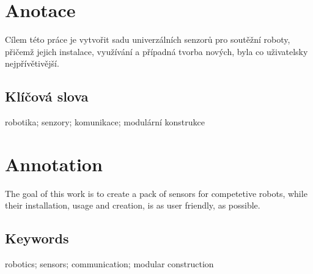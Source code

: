 \documentclass{template/socthesis}
\author{Tomáš Rohlínek}
\begin{document}
	\maketitle
	
	
	
	\pagestyle{empty}
	
	\section*{Anotace}
	Cílem této práce je vytvořit sadu univerzálních senzorů pro soutěžní roboty, přičemž jejich instalace, využívání a případná tvorba nových, byla co uživatelsky nejpřívětivější.
	
	\subsection*{Klíčová slova}
	robotika; senzory; komunikace; modulární konstrukce
	
	\vspace{20mm}
	
	\section*{Annotation}
	The goal of this work is to create a pack of sensors for competetive robots, while their installation, usage and creation, is as user friendly, as possible. 
	
	\subsection*{Keywords}
	robotics; sensors; communication; modular construction
	
	\newpage
	\pagestyle{plain}
	
	\tableofcontents %
	
	\setcounter{figure}{0}
	\setcounter{table}{0}
	\newpage
	
	
	
	
	
	
	
	
	
	
	
	
	
	
	
	
	\newpage
	\printbibliography[title=Literatura]
	
	\listoffigures
	
	\listoftables
	
	\listoflistedequation
	
\end{document}
